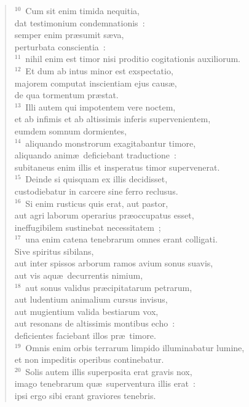 \begin{flushleft}
\begin{verse}
${}^{10}$~Cum sit enim timida nequitia,\\ dat testimonium condemnationis~:\\ semper enim pr\ae sumit s\ae va,\\ perturbata conscientia~:\\
${}^{11}$~nihil enim est timor nisi proditio cogitationis auxiliorum.\\
${}^{12}$~Et dum ab intus minor est exspectatio,\\ majorem computat inscientiam ejus caus\ae ,\\ de qua tormentum pr\ae stat.\\
${}^{13}$~Illi autem qui impotentem vere noctem,\\ et ab infimis et ab altissimis inferis supervenientem,\\ eumdem somnum dormientes,\\
${}^{14}$~aliquando monstrorum exagitabantur timore,\\ aliquando anim\ae\ deficiebant traductione~:\\ subitaneus enim illis et insperatus timor supervenerat.\\
${}^{15}$~Deinde si quisquam ex illis decidisset,\\ custodiebatur in carcere sine ferro reclusus.\\
${}^{16}$~Si enim rusticus quis erat, aut pastor,\\ aut agri laborum operarius pr\ae occupatus esset,\\ ineffugibilem sustinebat necessitatem~;\\
${}^{17}$~una enim catena tenebrarum omnes erant colligati.\\ Sive spiritus sibilans,\\ aut inter spissos arborum ramos avium sonus suavis,\\ aut vis aqu\ae\ decurrentis nimium,\\
${}^{18}$~aut sonus validus pr\ae cipitatarum petrarum,\\ aut ludentium animalium cursus invisus,\\ aut mugientium valida bestiarum vox,\\ aut resonans de altissimis montibus echo~:\\ deficientes faciebant illos pr\ae\ timore.\\
${}^{19}$~Omnis enim orbis terrarum limpido illuminabatur lumine,\\ et non impeditis operibus continebatur.\\
${}^{20}$~Solis autem illis superposita erat gravis nox,\\ imago tenebrarum qu\ae\ superventura illis erat~:\\ ipsi ergo sibi erant graviores tenebris.\end{verse}\end{flushleft}


